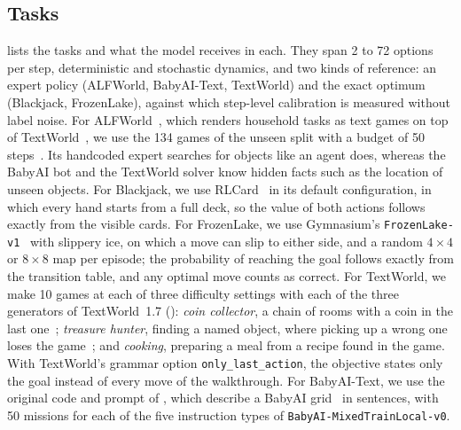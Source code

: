 \documentclass[table]{article}
\begin{document}
\subsection{Tasks}
\label{sec:sequential-tasks}

\begin{table}[t]
\centering
\caption{Sequential tasks. Actions/step: number of legal actions offered as options per step. Reference action: source of the per-step label.}
\label{tab:sequential-suite}
\footnotesize
\setlength{\tabcolsep}{4pt}

\end{table}

\begin{table}[t]
\centering
\caption{What the model receives and decides in each sequential task. Every step is one request: the state below and one Choice question over the listed options, asking for the option that best serves the goal.}
\label{tab:sequential-tasks}
\footnotesize

\end{table}
 lists the tasks and  what the model receives in each. They span 2 to 72 options per step, deterministic and stochastic dynamics, and two kinds of reference: an expert policy (ALFWorld, BabyAI-Text, TextWorld) and the exact optimum (Blackjack, FrozenLake), against which step-level calibration is measured without label noise. For ALFWorld~\cite{shridhar2021alfworld}, which renders household tasks as text games on top of TextWorld~\cite{cote2018textworld}, we use the 134 games of the unseen split with a budget of 50 steps~\cite{yao2023react}. Its handcoded expert searches for objects like an agent does, whereas the BabyAI bot and the TextWorld solver know hidden facts such as the location of unseen objects. For Blackjack, we use RLCard~\cite{zha2019rlcard} in its default configuration, in which every hand starts from a full deck, so the value of both actions follows exactly from the visible cards. For FrozenLake, we use Gymnasium's \texttt{FrozenLake-v1}~\cite{towers2024gymnasium} with slippery ice, on which a move can slip to either side, and a random $4{\times}4$ or $8{\times}8$ map per episode; the probability of reaching the goal follows exactly from the transition table, and any optimal move counts as correct. For TextWorld, we make 10 games at each of three difficulty settings with each of the three generators of TextWorld~1.7 (): \emph{coin collector}, a chain of rooms with a coin in the last one~\cite{yuan2018counting}; \emph{treasure hunter}, finding a named object, where picking up a wrong one loses the game~\cite{cote2018textworld}; and \emph{cooking}, preparing a meal from a recipe found in the game. With TextWorld's grammar option \texttt{only\_last\_action}, the objective states only the goal instead of every move of the walkthrough. For BabyAI-Text, we use the original code and prompt of \citet{carta2023grounding}, which describe a BabyAI grid~\cite{chevalierboisvert2019babyai} in sentences, with 50 missions for each of the five instruction types of \texttt{BabyAI-MixedTrainLocal-v0}.
\end{document}

